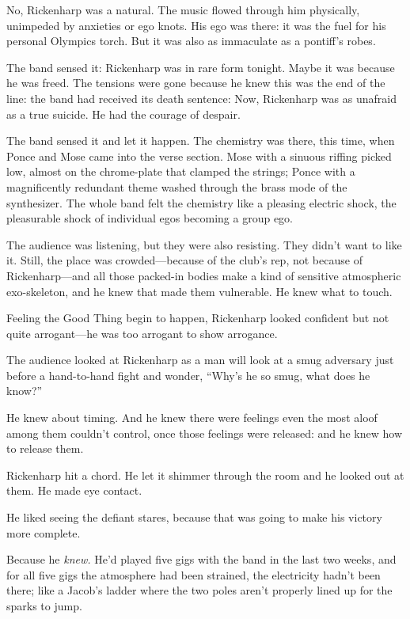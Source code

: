 No, Rickenharp was a natural. The music flowed through him physically, unimpeded by anxieties or ego knots. His ego was there: it was the fuel for his personal Olympics torch. But it was also as immaculate as a pontiff's robes.

The band sensed it: Rickenharp was in rare form tonight. Maybe it was because he was freed. The tensions were gone because he knew this was the end of the line: the band had received its death sentence: Now, Rickenharp was as unafraid as a true suicide. He had the courage of despair.

The band sensed it and let it happen. The chemistry was there, this time, when Ponce and Mose came into the verse section. Mose with a sinuous riffing picked low, almost on the chrome-plate that clamped the strings; Ponce with a magnificently redundant theme washed through the brass mode of the synthesizer. The whole band felt the chemistry like a pleasing electric shock, the pleasurable shock of individual egos becoming a group ego.

The audience was listening, but they were also resisting. They didn't want to like it. Still, the place was crowded---because of the club's rep, not because of Rickenharp---and all those packed-in bodies make a kind of sensitive atmospheric exo-skeleton, and he knew that made them vulnerable. He knew what to touch.

Feeling the Good Thing begin to happen, Rickenharp looked confident but not quite arrogant---he was too arrogant to show arrogance.

The audience looked at Rickenharp as a man will look at a smug adversary just before a hand-to-hand fight and wonder, ``Why's he so smug, what does he know?''

He knew about timing. And he knew there were feelings even the most aloof among them couldn't control, once those feelings were released: and he knew how to release them.

Rickenharp hit a chord. He let it shimmer through the room and he looked out at them. He made eye contact.

He liked seeing the defiant stares, because that was going to make his victory more complete.

Because he \textit{knew.} He'd played five gigs with the band in the last two weeks, and for all five gigs the atmosphere had been strained, the electricity hadn't been there; like a Jacob's ladder where the two poles aren't properly lined up for the sparks to jump.

